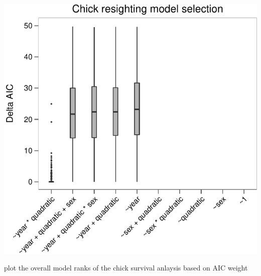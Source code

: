 \documentclass[]{article}
\begin{document}
\begin{center}\includegraphics{Ceuta_ASR_Matrix_Modeling_files/figure-latex/unnamed-chunk-55-1} \end{center}

plot the overall model ranks of the chick survival anlaysis based on AIC
weight
\end{document}
